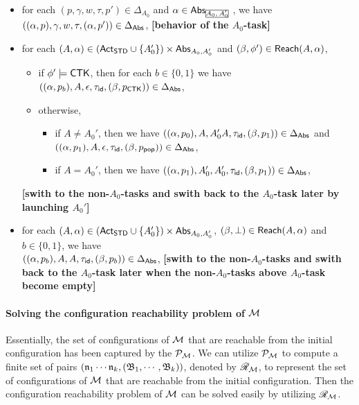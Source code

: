 {\begin{itemize}
    \item for each $(p,\gamma,w,\tau,p')\in\Delta_{A_0}$ and $\alpha\in\abs_{\mhcancel{A_0,A_0'}}$, we have $((\alpha,p),\gamma,w,\tau,(\alpha,p'))\in\Delta_{{\mathsf{Abs} }}$, \textbf{[behavior of the $A_0$-task]}
    \item for each $(A,\alpha)\in({\sf Act}_{{\sf STD}}\cup\{A_0'\})\times{\mathsf{Abs} }_{A_0,A_0'}$ and $(\beta,\phi')\in{\sf Reach}(A,\alpha)$, 
        \begin{itemize}
            \item if $\phi' \models {\sf CTK}$, then for each $b \in \{0,1\}$ we have $((\alpha,p_b),A,\epsilon,\tau_{\mathsf{id}},(\beta,p_{{\sf CTK}}))\in\Delta_{{\mathsf{Abs} }}$,
            \item otherwise,
            \begin{itemize}
                \item if $A\neq A_0'$, then we have
                    $((\alpha,p_0),A,A_0'A,\tau_{\mathsf{id}},(\beta,p_1))\in\Delta_{{\mathsf{Abs} }}$ and $((\alpha,p_1),A,\epsilon,\tau_{\mathsf{id}},(\beta,p_{\mathsf{pop}}))\in\Delta_{{\mathsf{Abs} }}$,
                \item if $A=A_0'$, then we have $((\alpha,p_1),A_0',A_0',\tau_{\mathsf{id}},(\beta,p_1))\in\Delta_{{\mathsf{Abs} }}$,
            \end{itemize}
        \end{itemize}
                \textbf{[swith to the non-$A_0$-tasks and swith back to the $A_0$-task later by launching $A_0'$]}
    \item for each $(A,\alpha)\in({\sf Act}_{{\sf STD}}\cup\{A_0'\})\times{\mathsf{Abs} }_{A_0,A_0'}$, $(\beta,\bot)\in{\sf Reach}(A,\alpha)$ and $b\in\{0,1\}$, we have \\
        $((\alpha,p_b),A,A,\tau_{\mathsf{id}},(\beta,p_b))\in\Delta_{{\mathsf{Abs} }}$,
            \textbf{[swith to the non-$A_0$-tasks and swith back to the $A_0$-task later when the non-$A_0$-tasks above $A_0$-task become empty]}
\end{itemize}
}


\paragraph{Solving the configuration reachability problem of ${\mathcal{M} }$} 
Essentially, the set of configurations of ${\mathcal{M} }$ that are reachable from the initial configuration  has been captured by the {\WOTrPDS} ${\mathcal{P} }_{\mathcal{M} }$.
We can utilize ${\mathcal{P} }_{\mathcal{M} }$ to compute a finite set of pairs $(\mathfrak{n}_1 \cdots \mathfrak{n}_k, ({\mathfrak{B} }_1, \cdots, {\mathfrak{B} }_k))$, denoted by $\mathscr{R}_{\mathcal{M} }$,  to represent the set of configurations of ${\mathcal{M} }$ that are reachable from the initial configuration. Then the configuration reachability problem of ${\mathcal{M} }$ can be solved easily by utilizing $\mathscr{R}_{\mathcal{M} }$. 

